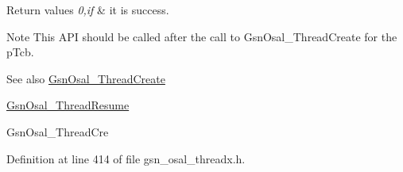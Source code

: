 \begin{DoxyRetVals}{Return values}
{\em 0,if} & it is success. \\
\hline
\end{DoxyRetVals}
\begin{DoxyNote}{Note}
This API should be called after the call to GsnOsal\_\-ThreadCreate for the pTcb. 
\end{DoxyNote}
\begin{DoxySeeAlso}{See also}
\hyperlink{a00628_ga1b2c29cb19f0f5a40f765072e570ee83}{GsnOsal\_\-ThreadCreate} 

\hyperlink{a00628_gaa895749a7c406cfe155217c8c1d57328}{GsnOsal\_\-ThreadResume} 

GsnOsal\_\-ThreadCre 
\end{DoxySeeAlso}


Definition at line 414 of file gsn\_\-osal\_\-threadx.h.

